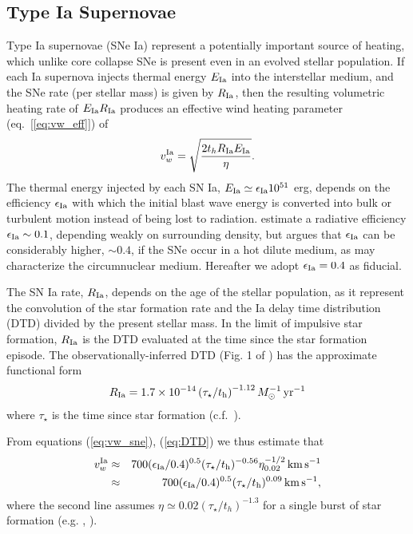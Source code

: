 \documentclass[usenatbib,fleqn]{mn2e}
\newcommand{\RateIa}{R_{\rm Ia}}
\begin{document}
\subsection{Type Ia Supernovae} 

Type Ia supernovae (SNe Ia) represent a potentially important source of heating, which unlike core collapse SNe is present even in an evolved stellar population.  If each Ia supernova injects thermal energy $E_{\rm Ia}$ into the interstellar medium, and the SNe rate (per stellar mass) is given by $R_{\rm   Ia}$, then the resulting volumetric heating rate of $E_{\rm Ia}R_{\rm  Ia}$ produces an effective wind heating parameter (eq.~[\ref{eq:vw_eff}]) of \begin{align} v_{w}^{\rm Ia} =\sqrt{\frac{2 t_h R_{\rm Ia}
E_{\rm Ia}}{\eta}} \label{eq:vw_sne}.
\end{align} The thermal energy injected by each SN Ia, $E_{\rm Ia} \simeq
\epsilon_{\rm Ia} 10^{51}$ erg, depends on the efficiency $\epsilon_{\rm Ia}$
with which the initial blast wave energy is converted into bulk or turbulent
motion instead of being lost to radiation.  \cite{Thornton+98}
estimate a radiative efficiency $\epsilon_{\rm Ia} \sim 0.1$,
depending weakly on surrounding density, but \citet{Sharma+14} argues
that $\epsilon_{\rm Ia}$ can be considerably higher, $\sim 0.4$, if
the SNe occur in a hot dilute medium, as may characterize the circumnuclear medium.  Hereafter we adopt $\epsilon_{\rm Ia} = 0.4$ as fiducial.

The SN Ia rate, $\RateIa$, depends on the age of the stellar population, as it represent the convolution of the star formation rate and the Ia delay time distribution (DTD) divided by the present stellar mass.  In
the limit of impulsive star formation, $\RateIa$ is the DTD evaluated at the time since the star formation episode.  The observationally-inferred DTD (Fig. 1 of \citealt{MaozMannucci+:2012a}) has the
approximate functional form \begin{align}
  R_{\rm Ia} =1.7\times 10^{-14}\left(\tau_{\star}/t_{\rm
      h}\right)^{-1.12} M_{\odot}^{-1}\,{\rm yr^{-1}}
\label{eq:DTD}
  \end{align}
  where $\tau_{\star}$ is the time since star formation
  (c.f.~\citealt{Scannapieco&Bildsten05}). 

From equations (\ref{eq:vw_sne}), (\ref{eq:DTD}) we thus estimate that 
  \begin{eqnarray} 
    v_{w}^{\rm Ia} &\approx& 700(\epsilon_{\rm
      Ia}/0.4)^{0.5}(\tau_{\star}/t_{\rm h})^{-0.56}\eta_{0.02}^{-1/2}\,{\rm km
      \,s^{-1}} \nonumber \\
&\approx& 700(\epsilon_{\rm
      Ia}/0.4)^{0.5}(\tau_{\star}/t_{\rm h})^{0.09}\,{\rm km
      \,s^{-1}},
\label{eq:vIa}
  \end{eqnarray}
where the second line assumes $\eta\simeq 0.02 (\tau_{\star}/t_h)^{-1.3}$ for a single burst of star formation (e.g. , \citealt{Ciotti+91}).
\end{document}
